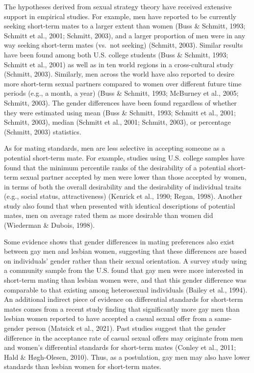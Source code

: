 \documentclass[
  11pt,
]{article}
\begin{document}
The hypotheses derived from sexual strategy theory have received
extensive support in empirical studies. For example, men have reported
to be currently seeking short-term mates to a larger extent than women
(Buss \& Schmitt, 1993; Schmitt et al., 2001; Schmitt, 2003), and a
larger proportion of men were in any way seeking short-term mates
(vs.~not seeking) (Schmitt, 2003). Similar results have been found among
both U.S. college students (Buss \& Schmitt, 1993; Schmitt et al., 2001)
as well as in ten world regions in a cross-cultural study (Schmitt,
2003). Similarly, men across the world have also reported to desire more
short-term sexual partners compared to women over different future time
periods (e.g., a month, a year) (Buss \& Schmitt, 1993; McBurney et al.,
2005; Schmitt, 2003). The gender differences have been found regardless
of whether they were estimated using mean (Buss \& Schmitt, 1993;
Schmitt et al., 2001; Schmitt, 2003), median (Schmitt et al., 2001;
Schmitt, 2003), or percentage (Schmitt, 2003) statistics.

As for mating standards, men are less selective in accepting someone as
a potential short-term mate. For example, studies using U.S. college
samples have found that the minimum percentile ranks of the desirability
of a potential short-term sexual partner accepted by men were lower than
those accepted by women, in terms of both the overall desirability and
the desirability of individual traits (e.g., social status,
attractiveness) (Kenrick et al., 1990; Regan, 1998). Another study also
found that when presented with identical descriptions of potential
mates, men on average rated them as more desirable than women did
(Wiederman \& Dubois, 1998).

Some evidence shows that gender differences in mating preferences also
exist between gay men and lesbian women, suggesting that these
differences are based on individuals' gender rather than their sexual
orientation. A survey study using a community sample from the U.S. found
that gay men were more interested in short-term mating than lesbian
women were, and that this gender difference was comparable to that
existing among heterosexual individuals (Bailey et al., 1994). An
additional indirect piece of evidence on differential standards for
short-term mates comes from a recent study finding that significantly
more gay men than lesbian women reported to have accepted a casual
sexual offer from a same-gender person (Matsick et al., 2021). Past
studies suggest that the gender difference in the acceptance rate of
casual sexual offers may originate from men and women's differential
standards for short-term mates (Conley et al., 2011; Hald \&
Høgh-Olesen, 2010). Thus, as a postulation, gay men may also have lower
standards than lesbian women for short-term mates.
\end{document}
